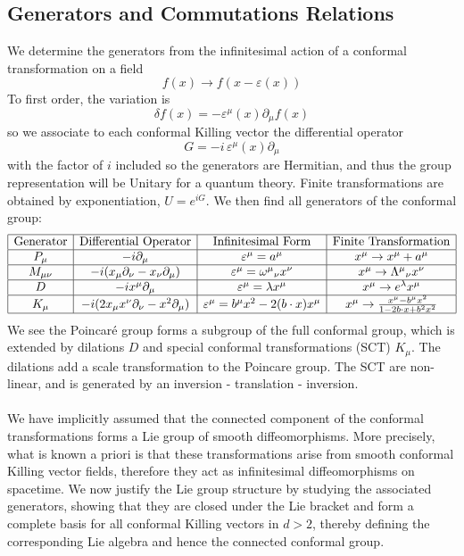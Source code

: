\documentclass{article}
\begin{document}
\subsection{Generators and Commutations Relations}
We determine the generators from the infinitesimal action of a conformal transformation on a field
\begin{equation}
f(x)\to f(x-\varepsilon(x))
\end{equation}
To first order, the variation is
\begin{equation}
\delta f(x) = -\varepsilon^\mu(x)\partial_\mu f(x)
\end{equation}
so we associate to each conformal Killing vector the differential operator
\begin{equation}
G = -i\,\varepsilon^\mu(x)\partial_\mu
\end{equation}
with the factor of \(i\) included so the generators are Hermitian, and thus the group representation will be Unitary for a quantum theory. Finite transformations are obtained by exponentiation, \(U=e^{iG}\).
We then find all generators of the conformal group: 
\begin{equation}
\begin{array}{|c|c|c|c|}
\hline
\text{Generator} & \text{Differential Operator} & \text{Infinitesimal Form} & \text{Finite Transformation} \\
\hline
P_\mu &
-i\partial_\mu &
\varepsilon^\mu = a^\mu &
x^\mu \rightarrow x^\mu + a^\mu \\
\hline
M_{\mu\nu} &
-i(x_\mu\partial_\nu - x_\nu\partial_\mu) &
\varepsilon^\mu = \omega^\mu{}_\nu x^\nu &
x^\mu \rightarrow \Lambda^\mu{}_\nu x^\nu \\
\hline
D &
-ix^\mu\partial_\mu &
\varepsilon^\mu = \lambda x^\mu &
x^\mu \rightarrow e^\lambda x^\mu \\
\hline
K_\mu &
-i(2x_\mu x^\nu\partial_\nu - x^2\partial_\mu) &
\varepsilon^\mu = b^\mu x^2 - 2(b\cdot x)x^\mu &
x^\mu \rightarrow \frac{x^\mu - b^\mu x^2}{1 - 2b\cdot x + b^2 x^2} \\
\hline
\end{array}
\end{equation}
We see the Poincaré group forms a subgroup of the full conformal group, which is extended by dilations $D$ and special conformal transformations (SCT) $K_\mu$. The dilations add a scale transformation to the Poincare group. The SCT are non-linear, and is generated by an inversion - translation - inversion. \\\\
We have implicitly assumed that the connected component of the conformal transformations forms a Lie group of smooth diffeomorphisms. More precisely, what is known a priori is that these transformations arise from smooth conformal Killing vector fields, therefore they act as infinitesimal diffeomorphisms on spacetime. We now justify the Lie group structure by studying the associated generators, showing that they are closed under the Lie bracket and form a complete basis for all conformal Killing vectors in $d > 2$, thereby defining the corresponding Lie algebra and hence the connected conformal group.
\end{document}

